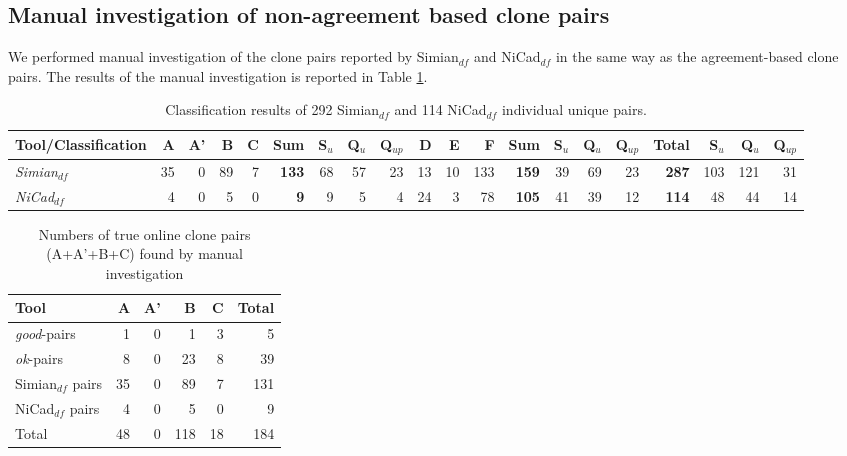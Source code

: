 \documentclass{sig-alternate-05-2015}
\begin{document}
\subsection{Manual investigation of non-agreement based clone pairs}
We performed manual investigation of the clone pairs reported by Simian$_{df}$ and NiCad$_{df}$ in the same way as the agreement-based clone pairs. The results of the manual investigation is reported in Table \ref{tab:classification_indv}.

\begin{table}
	\centering
	\caption{Classification results of 292 Simian$_{df}$ and 114 NiCad$_{df}$ individual unique pairs.}
	\label{tab:classification_indv}
	\small
	\begin{tabular}{|l|r|r|r|r|r|r|r|r|r|r|r|r|r|r|r|r|r|r|r|}
		\hline 
		Tool/Classification & A & A' & B & C & \textbf{Sum} & S$_{u}$ & Q$_{u}$ & Q$_{up}$ & D & E & F & \textbf{Sum}  & S$_{u}$ & Q$_{u}$ & Q$_{up}$ & \textbf{Total} & S$_{u}$ & Q$_{u}$  & Q$_{up}$  \\ 
		\hline 
		\multirow{1}{*}{\textit{Simian$_{df}$}} & 35 & 0 & 89 & 7 & \textbf{133} & 68 & 57 & 23 & 13 & 10 & 133 & \textbf{159} & 39 & 69 & 23 & \textbf{287} & 103 & 121 & 31 \\
		\hline
		\multirow{1}{*}{\textit{NiCad$_{df}$}} & 4  & 0 & 5 & 0 & \textbf{9} & 9 & 5 & 4 & 24 & 3 & 78 & \textbf{105} & 41 & 39 & 12 & \textbf{114} & 48 & 44 & 14 \\ 
		\hline
	\end{tabular} 
\end{table}

\begin{table}[H]
	\centering
	\caption{Numbers of true online clone pairs (A+A'+B+C) found by manual investigation}
	\label{tab:classification_true_pairs_summary}
	\begin{tabular}{l|r|r|r|r|r}
		\hline 
		Tool & A & A' & B & C & Total \\
		\hline
		\textit{good}-pairs & 1 & 0 & 1 & 3 & 5 \\
		\textit{ok}-pairs & 8 & 0 & 23 & 8 & 39 \\
		Simian$_{df}$ pairs & 35 & 0 & 89 & 7 & 131 \\
		NiCad$_{df}$ pairs & 4 & 0 & 5 & 0 & 9 \\
		\hline 
		Total & 48 & 0 & 118 & 18 & 184 \\
		\hline
	\end{tabular} 
\end{table}
\end{document}

